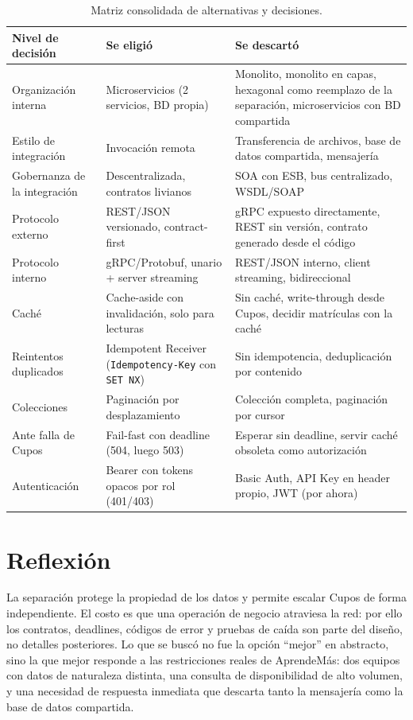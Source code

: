 \documentclass[11pt,spanish]{article}
\begin{document}
\begin{table}[H]
\centering
\small
\begin{tabularx}{\textwidth}{p{3.2cm} p{4.5cm} X}
\toprule
\textbf{Nivel de decisión} & \textbf{Se eligió} & \textbf{Se descartó} \\
\midrule
Organización interna & Microservicios (2 servicios, BD propia) & Monolito, monolito en capas, hexagonal como reemplazo de la separación, microservicios con BD compartida \\
\addlinespace
Estilo de integración & Invocación remota & Transferencia de archivos, base de datos compartida, mensajería \\
\addlinespace
Gobernanza de la integración & Descentralizada, contratos livianos & SOA con ESB, bus centralizado, WSDL/SOAP \\
\addlinespace
Protocolo externo & REST/JSON versionado, contract-first & gRPC expuesto directamente, REST sin versión, contrato generado desde el código \\
\addlinespace
Protocolo interno & gRPC/Protobuf, unario + server streaming & REST/JSON interno, client streaming, bidireccional \\
\addlinespace
Caché & Cache-aside con invalidación, solo para lecturas & Sin caché, write-through desde Cupos, decidir matrículas con la caché \\
\addlinespace
Reintentos duplicados & Idempotent Receiver (\texttt{Idempotency-Key} con \texttt{SET NX}) & Sin idempotencia, deduplicación por contenido \\
\addlinespace
Colecciones & Paginación por desplazamiento & Colección completa, paginación por cursor \\
\addlinespace
Ante falla de Cupos & Fail-fast con deadline (504, luego 503) & Esperar sin deadline, servir caché obsoleta como autorización \\
\addlinespace
Autenticación & Bearer con tokens opacos por rol (401/403) & Basic Auth, API Key en header propio, JWT (por ahora) \\
\bottomrule
\end{tabularx}
\caption{Matriz consolidada de alternativas y decisiones.}
\end{table}

\section{Reflexión}

La separación protege la propiedad de los datos y permite escalar Cupos de forma independiente. El costo es que una operación de negocio atraviesa la red: por ello los contratos, deadlines, códigos de error y pruebas de caída son parte del diseño, no detalles posteriores. Lo que se buscó no fue la opción ``mejor'' en abstracto, sino la que mejor responde a las restricciones reales de AprendeMás: dos equipos con datos de naturaleza distinta, una consulta de disponibilidad de alto volumen, y una necesidad de respuesta inmediata que descarta tanto la mensajería como la base de datos compartida.
\end{document}
